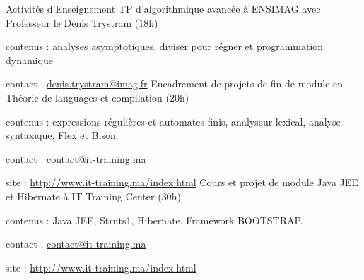 
\begin{rubric}{Activités d’Enseignement}
\entry*[$2015$ -- $2016$]%
	TP d'algorithmique avancée à ENSIMAG avec Professeur le Denis Trystram ($18$h)
	\par contenus : analyses asymptotiques, diviser pour régner et programmation dynamique
	\par contact :  \href{mailto:denis.trystram@imag.fr}{denis.trystram@imag.fr}
%
\entry*[$2014$ -- $2015$]
        Encadrement de projets de fin de module en Théorie de languages et compilation ($20$h)
	\par contenus : expressions régulières et automates finis, analyseur lexical, analyse syntaxique, Flex et Bison.
	\par contact :  \href{mailto:contact@it-training.ma}{contact@it-training.ma}
	\par site : \url{http://www.it-training.ma/index.html}
%
\entry*[$2014$ -- $2015$]%
        Cours et projet de module Java JEE et Hibernate à IT Training Center ($30$h)
	\par contenus : Java JEE, Struts1, Hibernate, Framework BOOTSTRAP.
	\par contact :  \href{mailto:contact@it-training.ma}{contact@it-training.ma}
	\par site : \url{http://www.it-training.ma/index.html}
%
\end{rubric}
